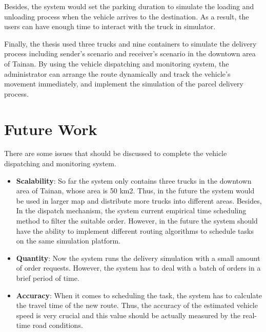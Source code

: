 \documentclass[12pt]{ksthesis}
\begin{document}
\begin{thesis}
{Besides, the system would set the parking duration to simulate the loading and unloading process when the vehicle arrives to the destination. As a result, the users can have enough time to interact with the truck in simulator. 

Finally, the thesis used three trucks and nine containers to simulate the delivery process including sender’s scenario and receiver’s scenario in the downtown area of Tainan. By using the vehicle dispatching and monitoring system, the administrator can arrange the route dynamically and track the vehicle’s movement immediately, and implement the simulation of the parcel delivery process.




\section{Future Work}

There are some issues that should be discussed to complete the vehicle dispatching and monitoring system.

\begin{itemize}


\item
\textbf{Scalability}: So far the system only contains three trucks in the downtown area of Tainan, whose area is 50 km2. Thus, in the future the system would be used in larger map and distribute more trucks into different areas. Besides, In the dispatch mechanism, the system current empirical time scheduling method to filter the suitable order. However, in the future the system should have the ability to implement different routing algorithms to schedule tasks on the same simulation platform.

\item
\textbf{Quantity}: Now the system runs the delivery simulation with a small amount of order requests. However, the system has to deal with a batch of orders in a brief period of time.

\item
\textbf{Accuracy}: When it comes to scheduling the task, the system has to calculate the travel time of the new route. Thus, the accuracy of the estimated vehicle speed is very crucial and this value should be actually measured by the real-time road conditions.

\end{itemize}


} \end{thesis}
\end{document}

